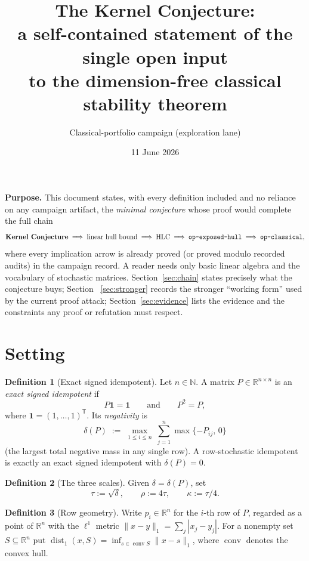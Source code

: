 \documentclass[11pt]{article}
\title{The Kernel Conjecture:\\ a self-contained statement of the single open input\\
to the dimension-free classical stability theorem}
\author{Classical-portfolio campaign (exploration lane)}
\date{11 June 2026}
\theoremstyle{plain}
\theoremstyle{definition}
\newtheorem{definition}{Definition}
\theoremstyle{remark}
\newcommand{\one}{\mathbf 1}
\newcommand{\R}{\mathbb R}
\newcommand{\dist}{\operatorname{dist}_1}
\newcommand{\conv}{\operatorname{conv}}
\begin{document}
\maketitle

\noindent\textbf{Purpose.} This document states, with every definition included and no
reliance on any campaign artifact, the \emph{minimal conjecture} whose proof would complete
the full chain
\[
\textbf{Kernel Conjecture}
\;\Longrightarrow\; \text{linear hull bound}
\;\Longrightarrow\; \text{HLC}
\;\Longrightarrow\; \text{\texttt{op-exposed-hull}}
\;\Longrightarrow\; \text{\texttt{op-classical}},
\]
where every implication arrow is already proved (or proved modulo recorded audits) in the
campaign record. A reader needs only basic linear algebra and the vocabulary of stochastic
matrices. Section~\ref{sec:chain} states precisely what the conjecture buys; Section~%
\ref{sec:stronger} records the stronger ``working form'' used by the current proof attack;
Section~\ref{sec:evidence} lists the evidence and the constraints any proof or refutation
must respect.

\section{Setting}

\begin{definition}[Exact signed idempotent]\label{def:esi}
Let $n\in\mathbb N$. A matrix $P\in\R^{n\times n}$ is an \emph{exact signed idempotent} if
\[
P\one=\one \qquad\text{and}\qquad P^2=P ,
\]
where $\one=(1,\dots,1)^{\mathsf T}$. Its \emph{negativity} is
\[
\delta(P)\;:=\;\max_{1\le i\le n}\ \sum_{j=1}^{n}\max\{-P_{ij},\,0\}
\]
(the largest total negative mass in any single row). A row-stochastic idempotent is exactly
an exact signed idempotent with $\delta(P)=0$.
\end{definition}

\begin{definition}[The three scales]\label{def:scales}
Given $\delta=\delta(P)$, set
\[
\tau:=\sqrt{\delta},\qquad \rho:=4\tau,\qquad \kappa:=\tau/4 .
\]
\end{definition}

\begin{definition}[Row geometry]\label{def:rows}
Write $p_i\in\R^n$ for the $i$-th row of $P$, regarded as a point of $\R^n$ with the
$\ell^1$ metric $\|x-y\|_1=\sum_j|x_j-y_j|$. For a nonempty set $S\subseteq\R^n$ put
$\dist(x,S)=\inf_{s\in\conv S}\|x-s\|_1$, where $\conv$ denotes the convex hull.
\end{definition}
\end{document}
